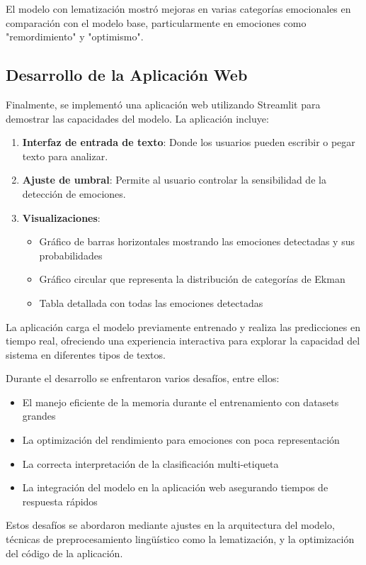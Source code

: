 \documentclass[12pt,a4paper]{report}
\begin{document}
El modelo con lematización mostró mejoras en varias categorías emocionales en comparación con el modelo base, particularmente en emociones como "remordimiento" y "optimismo".

\subsection{Desarrollo de la Aplicación Web}

Finalmente, se implementó una aplicación web utilizando Streamlit para demostrar las capacidades del modelo. La aplicación incluye:

\begin{enumerate}
  \item \textbf{Interfaz de entrada de texto}: Donde los usuarios pueden escribir o pegar texto para analizar.
  \item \textbf{Ajuste de umbral}: Permite al usuario controlar la sensibilidad de la detección de emociones.
  \item \textbf{Visualizaciones}:
  \begin{itemize}
    \item Gráfico de barras horizontales mostrando las emociones detectadas y sus probabilidades
    \item Gráfico circular que representa la distribución de categorías de Ekman
    \item Tabla detallada con todas las emociones detectadas
  \end{itemize}
\end{enumerate}

La aplicación carga el modelo previamente entrenado y realiza las predicciones en tiempo real, ofreciendo una experiencia interactiva para explorar la capacidad del sistema en diferentes tipos de textos.

Durante el desarrollo se enfrentaron varios desafíos, entre ellos:
\begin{itemize}
  \item El manejo eficiente de la memoria durante el entrenamiento con datasets grandes
  \item La optimización del rendimiento para emociones con poca representación
  \item La correcta interpretación de la clasificación multi-etiqueta
  \item La integración del modelo en la aplicación web asegurando tiempos de respuesta rápidos
\end{itemize}

Estos desafíos se abordaron mediante ajustes en la arquitectura del modelo, técnicas de preprocesamiento lingüístico como la lematización, y la optimización del código de la aplicación.
\end{document}
